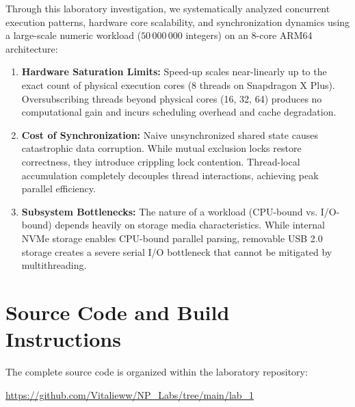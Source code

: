\documentclass[12pt,a4paper]{article}
\begin{document}
Through this laboratory investigation, we systematically analyzed concurrent execution patterns, hardware core scalability, and synchronization dynamics using a large-scale numeric workload ($50\,000\,000$ integers) on an 8-core ARM64 architecture:
\begin{enumerate}
    \item \textbf{Hardware Saturation Limits:} Speed-up scales near-linearly up to the exact count of physical execution cores (8 threads on Snapdragon X Plus). Oversubscribing threads beyond physical cores (16, 32, 64) produces no computational gain and incurs scheduling overhead and cache degradation.
    \item \textbf{Cost of Synchronization:} Naive unsynchronized shared state causes catastrophic data corruption. While mutual exclusion locks restore correctness, they introduce crippling lock contention. Thread-local accumulation completely decouples thread interactions, achieving peak parallel efficiency.
    \item \textbf{Subsystem Bottlenecks:} The nature of a workload (CPU-bound vs. I/O-bound) depends heavily on storage media characteristics. While internal NVMe storage enables CPU-bound parallel parsing, removable USB 2.0 storage creates a severe serial I/O bottleneck that cannot be mitigated by multithreading.
\end{enumerate}

\section{Source Code and Build Instructions}

The complete source code is organized within the laboratory repository:
\begin{center}
\large
\url{https://github.com/Vitalieww/NP_Labs/tree/main/lab_1}
\end{center}
\end{document}
